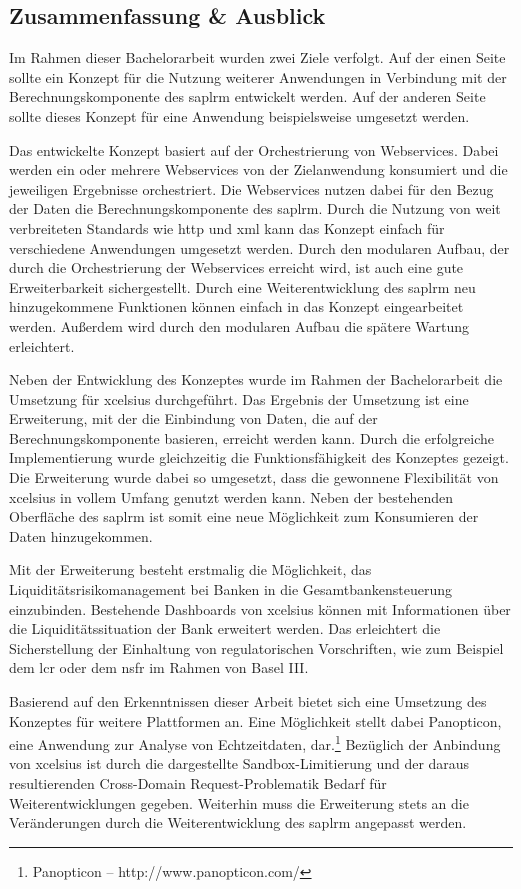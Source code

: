 \begin{onehalfspacing}
\chapter{Zusammenfassung \& Ausblick}

Im Rahmen dieser Bachelorarbeit wurden zwei Ziele verfolgt. Auf der einen Seite sollte ein Konzept für die Nutzung weiterer Anwendungen in Verbindung mit der Berechnungskomponente des \gls{saplrm} entwickelt werden. Auf der anderen Seite sollte dieses Konzept für eine Anwendung beispielsweise umgesetzt werden. 

Das entwickelte Konzept basiert auf der Orchestrierung von Webservices. Dabei werden ein oder mehrere Webservices von der Zielanwendung konsumiert und die jeweiligen Ergebnisse orchestriert. Die Webservices nutzen dabei für den Bezug der Daten die Berechnungskomponente des \gls{saplrm}. Durch die Nutzung von weit verbreiteten Standards wie \gls{http} und \gls{xml} kann das Konzept einfach für verschiedene Anwendungen umgesetzt werden. Durch den modularen Aufbau, der durch die Orchestrierung der Webservices erreicht wird, ist auch eine gute Erweiterbarkeit sichergestellt. Durch eine Weiterentwicklung des \gls{saplrm} neu hinzugekommene Funktionen können einfach in das Konzept eingearbeitet werden. Außerdem wird durch den modularen Aufbau die spätere Wartung erleichtert.

Neben der Entwicklung des Konzeptes wurde im Rahmen der Bachelorarbeit die Umsetzung für \gls{xcelsius} durchgeführt. Das Ergebnis der Umsetzung ist eine Erweiterung, mit der die Einbindung von Daten, die auf der Berechnungskomponente basieren, erreicht werden kann. Durch die erfolgreiche Implementierung wurde gleichzeitig die Funktionsfähigkeit des Konzeptes gezeigt. Die Erweiterung wurde dabei so umgesetzt, dass die gewonnene Flexibilität von \gls{xcelsius} in vollem Umfang genutzt werden kann. Neben der bestehenden Oberfläche des \gls{saplrm} ist somit eine neue Möglichkeit zum Konsumieren der Daten hinzugekommen.

Mit der Erweiterung besteht erstmalig die Möglichkeit, das Liquiditätsrisikomanagement bei Banken in die Gesamtbankensteuerung einzubinden. Bestehende Dashboards von \gls{xcelsius} können mit Informationen über die Liquiditätssituation der Bank erweitert werden. Das erleichtert die Sicherstellung der Einhaltung von regulatorischen Vorschriften, wie zum Beispiel dem \gls{lcr} oder dem \gls{nsfr} im Rahmen von Basel III.

Basierend auf den Erkenntnissen dieser Arbeit bietet sich eine Umsetzung des Konzeptes für weitere Plattformen an. Eine Möglichkeit stellt dabei Panopticon, eine Anwendung zur Analyse von Echtzeitdaten, dar.\footnote{Panopticon -- http://www.panopticon.com/} Bezüglich der Anbindung von \gls{xcelsius} ist durch die dargestellte Sandbox-Limitierung und der daraus resultierenden Cross-Domain Request-Problematik Bedarf für Weiterentwicklungen gegeben. Weiterhin muss die Erweiterung stets an die Veränderungen durch die Weiterentwicklung des \gls{saplrm} angepasst werden.


\end{onehalfspacing}
